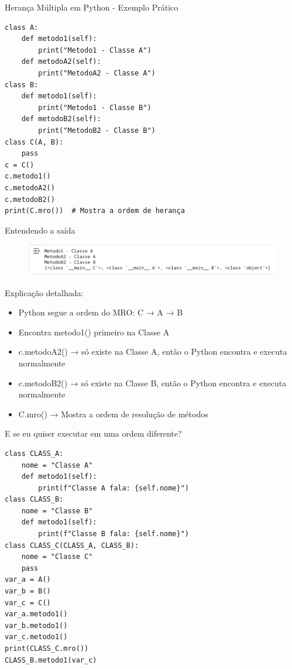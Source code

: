 \begin{frame}[fragile]{Herança Múltipla em Python - Exemplo Prático}
\small
\begin{verbatim}
class A:
    def metodo1(self):
        print("Metodo1 - Classe A")  
    def metodoA2(self):
        print("MetodoA2 - Classe A")    
class B:
    def metodo1(self):
        print("Metodo1 - Classe B")
    def metodoB2(self):
        print("MetodoB2 - Classe B")    
class C(A, B):
    pass
c = C()
c.metodo1()
c.metodoA2()
c.metodoB2()
print(C.mro())  # Mostra a ordem de herança
\end{verbatim}
\end{frame}

\begin{frame}{Entendendo a saída}
\begin{figure}
    \centering
    \includegraphics[width=0.9\linewidth]{Images/mro-saida-2.png}

\end{figure}


Explicação detalhada:
    \begin{itemize}
        \item Python segue a ordem do MRO: C → A → B
         \item        Encontra metodo1() primeiro na Classe A
         \item   c.metodoA2() → só existe na Classe A, então o  Python encontra e executa normalmente
          \item    c.metodoB2() → só existe na Classe B, então o  Python encontra e executa normalmente
          \item  C.mro() → Mostra a ordem de resolução de métodos
    \end{itemize}



    
\end{frame}

\begin{frame}[fragile]{E se eu quiser executar em uma ordem diferente?}
\footnotesize
    \begin{verbatim}
class CLASS_A:
    nome = "Classe A"
    def metodo1(self):
        print(f"Classe A fala: {self.nome}")  
class CLASS_B:
    nome = "Classe B"
    def metodo1(self):
        print(f"Classe B fala: {self.nome}")
class CLASS_C(CLASS_A, CLASS_B):
    nome = "Classe C"
    pass
var_a = A()
var_b = B()
var_c = C()
var_a.metodo1()
var_b.metodo1()
var_c.metodo1()
print(CLASS_C.mro())
CLASS_B.metodo1(var_c)  
    \end{verbatim}
\end{frame}

